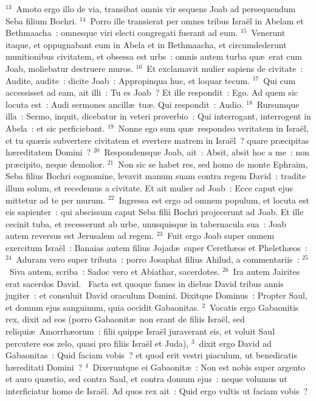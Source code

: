 ${}^{13}$~Amoto ergo illo de via, transibat omnis vir sequens Joab ad persequendum Seba filium Bochri.
${}^{14}$~Porro ille transierat per omnes tribus Isra\"el in Abelam et Bethmaacha~: omnesque viri electi congregati fuerant ad eum.
${}^{15}$~Venerunt itaque, et oppugnabant eum in Abela et in Bethmaacha, et circumdederunt munitionibus civitatem, et obsessa est urbs~: omnis autem turba qu\ae\ erat cum Joab, moliebatur destruere muros.
${}^{16}$~Et exclamavit mulier sapiens de civitate~: Audite, audite~: dicite Joab~: Appropinqua huc, et loquar tecum.
${}^{17}$~Qui cum accessisset ad eam, ait illi~: Tu es Joab~? Et ille respondit~: Ego. Ad quem sic locuta est~: Audi sermones ancill\ae\ tu\ae . Qui respondit~: Audio.
${}^{18}$~Rursumque illa~: Sermo, inquit, dicebatur in veteri proverbio~: Qui interrogant, interrogent in Abela~: et sic perficiebant.
${}^{19}$~Nonne ego sum qu\ae\ respondeo veritatem in Isra\"el, et tu qu\ae ris subvertere civitatem et evertere matrem in Isra\"el~? quare pr\ae cipitas h\ae reditatem Domini~?
${}^{20}$~Respondensque Joab, ait~: Absit, absit hoc a me~: non pr\ae cipito, neque demolior.
${}^{21}$~Non sic se habet res, sed homo de monte Ephraim, Seba filius Bochri cognomine, levavit manum suam contra regem David~: tradite illum solum, et recedemus a civitate. Et ait mulier ad Joab~: Ecce caput ejus mittetur ad te per murum.
${}^{22}$~Ingressa est ergo ad omnem populum, et locuta est eis sapienter~: qui abscissum caput Seba filii Bochri projecerunt ad Joab. Et ille cecinit tuba, et recesserunt ab urbe, unusquisque in tabernacula sua~: Joab autem reversus est Jerusalem ad regem.
${}^{23}$~Fuit ergo Joab super omnem exercitum Isra\"el~: Banaias autem filius Jojad\ae\ super Cereth\ae os et Pheleth\ae os~:
${}^{24}$~Aduram vero super tributa~: porro Josaphat filius Ahilud, a commentariis~:
${}^{25}$~Siva autem, scriba~: Sadoc vero et Abiathar, sacerdotes.
${}^{26}$~Ira autem Jairites erat sacerdos David.
~Facta est quoque fames in diebus David tribus annis jugiter~: et consuluit David oraculum Domini. Dixitque Dominus~: Propter Saul, et domum ejus sanguinum, quia occidit Gabaonitas.
${}^{2}$~Vocatis ergo Gabaonitis rex, dixit ad eos (porro Gabaonit\ae\ non erant de filiis Isra\"el, sed reliqui\ae\ Amorrh\ae orum~: filii quippe Isra\"el juraverant eis, et voluit Saul percutere eos zelo, quasi pro filiis Isra\"el et Juda),
${}^{3}$~dixit ergo David ad Gabaonitas~: Quid faciam vobis~? et quod erit vestri piaculum, ut benedicatis h\ae reditati Domini~?
${}^{4}$~Dixeruntque ei Gabaonit\ae~: Non est nobis super argento et auro qu\ae stio, sed contra Saul, et contra domum ejus~: neque volumus ut interficiatur homo de Isra\"el. Ad quos rex ait~: Quid ergo vultis ut faciam vobis~?
